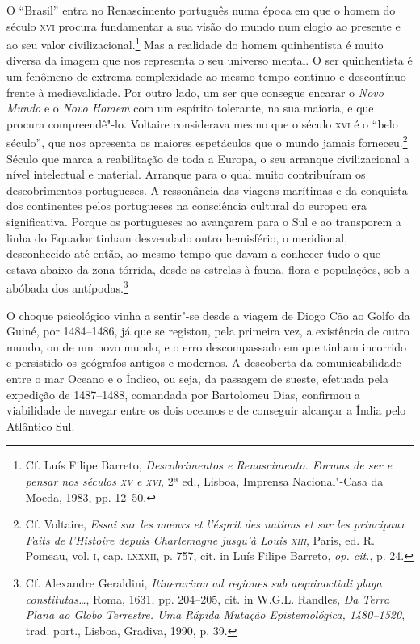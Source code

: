 O ``Brasil'' entra no Renascimento português numa época em que o
homem do século \textsc{xvi} procura fundamentar a sua visão do mundo num elogio
ao presente e ao seu valor civilizacional.\footnote{ Cf. Luís
Filipe Barreto, \textit{Descobrimentos e Renascimento. Formas de ser e
pensar nos séculos \textsc{xv} e \textsc{xvi}}, 2ª ed., Lisboa, Imprensa Nacional"-Casa da
Moeda, 1983, pp. 12--50.} Mas a realidade do homem quinhentista é 
muito diversa da imagem que nos representa o seu
universo mental. O ser quinhentista é um fenômeno de extrema
complexidade ao mesmo tempo contínuo e descontínuo frente à
medievalidade. Por outro lado, um ser que consegue encarar o
\textit{Novo Mundo} e o \textit{Novo Homem} com um espírito tolerante,
na sua maioria, e que procura compreendê"-lo. Voltaire considerava
mesmo que o século \textsc{xvi} é o ``belo século'', que nos apresenta os maiores
espetáculos que o mundo jamais forneceu.\footnote{ Cf. Voltaire,
\textit{Essai sur les m\oe urs et l'ésprit des nations et sur
les principaux Faits de l'Histoire depuis Charlemagne jusqu'à Louis
\textsc{xiii}}, Paris, ed. R. Pomeau, vol. \textsc{i}, cap. \textsc{lxxxii}, p. 757, cit. in Luís
Filipe Barreto, \textit{op. cit.}, p. 24.} Século que marca a
reabilitação de toda a Europa, o seu arranque civilizacional a nível
intelectual e material. 
Arranque para o qual muito contribuíram os descobrimentos
portugueses. A ressonância das viagens marítimas e da conquista dos
continentes pelos portugueses na consciência cultural do europeu era
significativa. Porque os portugueses ao avançarem para o Sul e ao
transporem a linha do Equador tinham desvendado outro hemisfério, o
meridional, desconhecido até então, ao mesmo tempo que davam a
conhecer tudo o que estava abaixo da zona tórrida, desde as estrelas à
fauna, flora e populações, sob a abóbada dos antípodas.\footnote{ Cf. Alexandre 
Geraldini, \textit{Itinerarium ad regiones sub
aequinoctiali plaga constitutas\ldots{}}, Roma, 1631, pp. 204--205, cit. in
W.G.L. Randles, \textit{Da Terra Plana ao Globo Terrestre. Uma Rápida
Mutação Epistemológica, 1480--1520}, trad. port., Lisboa,
Gradiva, 1990, p. 39.} 

O choque psicológico vinha a sentir"-se desde a viagem de Diogo Cão ao
Golfo da Guiné, por 1484--1486, já que se registou, pela primeira vez, a
existência de outro mundo, ou de um novo mundo, e o erro descompassado
em que tinham incorrido e persistido os geógrafos antigos e modernos. A
descoberta da comunicabilidade entre o mar Oceano e o Índico, ou seja,
da passagem de sueste, efetuada pela expedição de 1487--1488, comandada
por Bartolomeu Dias, confirmou a viabilidade de navegar entre os dois
oceanos e de conseguir alcançar a Índia pelo Atlântico Sul. 

